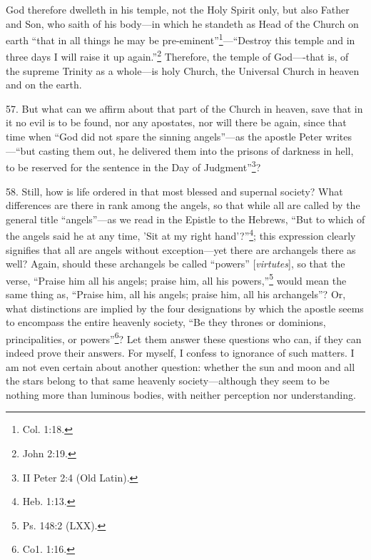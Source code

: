 God therefore dwelleth in his temple, not the Holy Spirit only, but also Father and Son, who saith of his body—in which he standeth as Head of the Church on earth ``that in all things he may be pre-eminent''\footnote{Col. 1:18.}—``Destroy this temple and in three days I will raise it up again.''\footnote{John 2:19.} Therefore, the temple of God—-that is, of the supreme Trinity as a whole—is holy Church, the Universal Church in heaven and on the earth.

57. But what can we affirm about that part of the Church in heaven, save that in it no evil is to be found, nor any apostates, nor will there be again, since that time when ``God did not spare the sinning angels''—as the apostle Peter writes—``but casting them out, he delivered them into the prisons of darkness in hell, to be reserved for the sentence in the Day of Judgment''\footnote{II Peter 2:4 (Old Latin).}?

58. Still, how is life ordered in that most blessed and supernal society? What differences are there in rank among the angels, so that while all are called by the general title ``angels''—as we read in the Epistle to the Hebrews, ``But to which of the angels said he at any time, 'Sit at my right hand'?''\footnote{Heb. 1:13.}; this expression clearly signifies that all are angels without exception—yet there are archangels there as well? Again, should these archangels be called ``powers'' [\emph{virtutes}], so that the verse, ``Praise him all his angels; praise him, all his powers,''\footnote{Ps. 148:2 (LXX).} would mean the same thing as, ``Praise him, all his angels; praise him, all his archangels''? Or, what distinctions are implied by the four designations by which the apostle seems to encompass the entire heavenly society, ``Be they thrones or dominions, principalities, or powers''\footnote{Co1. 1:16.}? Let them answer these questions who can, if they can indeed prove their answers. For myself, I confess to ignorance of such matters. I am not even certain about another question: whether the sun and moon and all the stars belong to that same heavenly society—although they seem to be nothing more than luminous bodies, with neither perception nor understanding.

